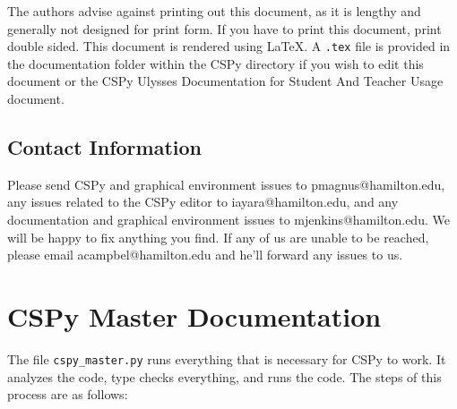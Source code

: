 \documentclass{article}
\begin{document}
The authors advise against printing out this document, as it is lengthy and generally not designed for print form. If you have to print this document, print double sided. This document is rendered using \LaTeX. A \verb|.tex| file is provided in the documentation folder within the CSPy directory if you wish to edit this document or the CSPy Ulysses Documentation for Student And Teacher Usage document.

\subsection{Contact Information}
Please send CSPy and graphical environment issues to pmagnus@hamilton.edu, any issues related to the CSPy editor to iayara@hamilton.edu, and any documentation and graphical environment issues to mjenkins@hamilton.edu. We will be happy to fix anything you find. If any of us are unable to be reached, please email acampbel@hamilton.edu and he'll forward any issues to us.

\pagebreak
\section{CSPy Master Documentation}
The file \verb|cspy_master.py| runs everything that is necessary for CSPy to work. It analyzes the code, type checks everything, and runs the code. The steps of this process are as follows:
\end{document}
